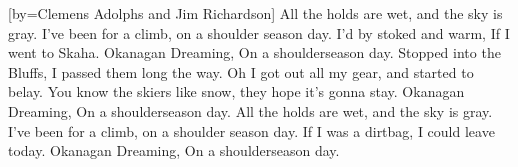 [by={Clemens Adolphs and Jim Richardson}]
\beginverse*
All the holds are wet,
and the sky is gray.
I've been for a climb,
on a shoulder season day.
I'd by stoked and warm,
If I went to Skaha.
Okanagan Dreaming,
On a shoulderseason day.
\endverse
\beginverse*
Stopped into the Bluffs,
I passed them long the way.
Oh I got out all my gear,
and started to belay.
You know the skiers like snow,
they hope it's gonna stay.
Okanagan Dreaming,
On a shoulderseason day.
\endverse
\beginverse*
All the holds are wet,
and the sky is gray.
I've been for a climb,
on a shoulder season day.
If I was a dirtbag,
I could leave today.
Okanagan Dreaming,
On a shoulderseason day.
\endverse
\endsong
